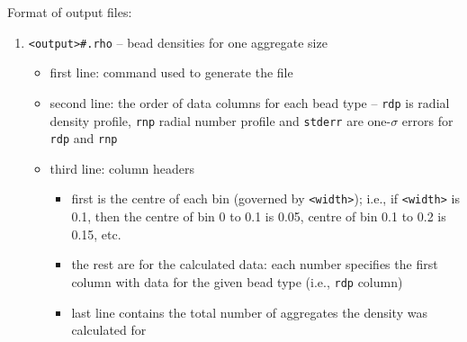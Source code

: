 \noindent
Format of output files:
\begin{enumerate}[nosep,leftmargin=20pt]
  \item \texttt{<output>#.rho} -- bead densities for one aggregate size
    \begin{itemize}[nosep,leftmargin=5pt]
      \item first line: command used to generate the file
      \item second line: the order of data columns for each bead type --
        \texttt{rdp} is radial density profile, \texttt{rnp} radial number
        profile and \texttt{stderr} are one-$\sigma$ errors for \texttt{rdp}
        and \texttt{rnp}
      \item third line: column headers
        \begin{itemize}[nosep,leftmargin=10pt]
          \item first is the centre of each bin (governed by
            \texttt{<width>}); i.e., if \texttt{<width>} is 0.1,
            then the centre of bin 0 to 0.1 is 0.05, centre of bin 0.1 to
            0.2 is 0.15, etc.
          \item the rest are for the calculated data: each number specifies
            the first column with data for the given bead type (i.e.,
            \texttt{rdp} column)
          \item last line contains the total number of aggregates the
            density was calculated for
        \end{itemize}
    \end{itemize}
\end{enumerate}
